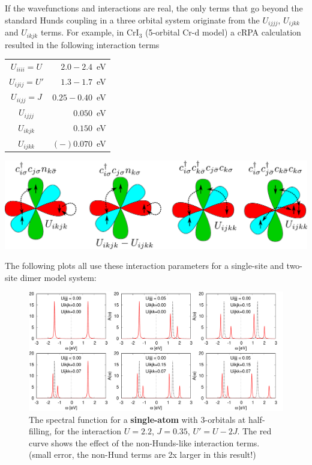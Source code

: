 \documentclass[12pt,a4paper]{scrartcl}
\numberwithin{equation}{section}
\begin{document}
If the wavefunctions and interactions are real, the only terms that go beyond the standard 
Hunds coupling in a three orbital system originate from the $U_{ijjj}$, $U_{ijkk}$ and $U_{ikjk}$ terms.
For example, in CrI$_3$ (5-orbital Cr-d model) a cRPA calculation resulted in the following interaction terms
\begin{center}
\begin{tabular}{|c|r|}
\hline
 $U_{iiii}=U$ & $ 2.0-2.4$~eV \\
 $U_{ijij}=U'$ & $ 1.3-1.7$~eV \\
 $U_{iijj}=J$ & $ 0.25-0.40$~eV \\ \hline
 $U_{ijjj}$ & $ 0.050$~eV \\
 $U_{ikjk}$ & $ 0.150$~eV \\
 $U_{ijkk}$ & $(-)0.070$~eV \\ \hline
\end{tabular}
\end{center}

\begin{center}
\includegraphics[width=1\textwidth]{figs/nonHund/3orb.pdf} 
\end{center}

The following plots all use these interaction parameters for a single-site and two-site dimer model system:


\begin{figure}[h]
 \includegraphics[width=1.0\textwidth]{figs/nonHund/gf_3orb.pdf}
 \caption{The spectral function for a \textbf{single-atom} with 3-orbitals at half-filling, 
  for the interaction $U=2.2$, $J=0.35$, $U'=U-2J$. The red curve shows the effect of the non-Hunds-like interaction terms.
  (small error, the non-Hund terms are 2x larger in this result!)
  }
\end{figure}
\end{document}
